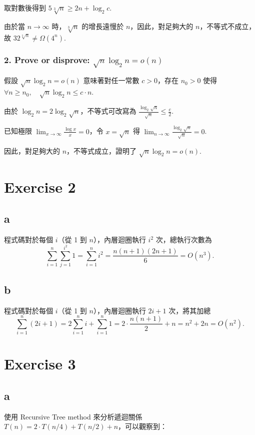\documentclass[8pt, fleqn]{report}
\begin{document}
取對數後得到 \(5\sqrt[3]{n} \geq 2n + \log_2 c\).

由於當 \(n \to \infty\) 時，\(\sqrt[3]{n}\) 的增長遠慢於 \(n\)，因此，對足夠大的 \(n\)，不等式不成立，故 \(32^{\sqrt[3]{n}} \neq \Omega(4^n)\).

\subsubsection*{2. Prove or disprove: \(\sqrt{n}\log_2{n} = o(n)\)}
假設 \(\sqrt{n}\log_2{n} = o(n)\) 意味著對任一常數 \(c > 0\)，存在 \(n_0 > 0\) 使得 \(\forall n \geq n_0, \quad \sqrt{n}\log_2{n} \leq c \cdot n\).

由於 \(\log_2{n} = 2\log_2\sqrt{n}\)，不等式可改寫為 \(\frac{\log_2\sqrt{n}}{\sqrt{n}} \leq \frac{c}{2}\).

已知極限 \(\lim_{x \to \infty} \frac{\log x}{x} = 0\)，令 \(x = \sqrt{n}\) 得 \(\lim_{n \to \infty} \frac{\log_2\sqrt{n}}{\sqrt{n}} = 0\).

因此，對足夠大的 \(n\)，不等式成立，證明了 \(\sqrt{n}\log_2{n} = o(n)\).

\section*{Exercise 2}

\subsection*{a}
程式碼對於每個 \(i\)（從 1 到 \(n\)），內層迴圈執行 \(i^2\) 次，總執行次數為
\[
    \sum_{i=1}^{n} \sum_{j=1}^{i^2} 1 = \sum_{i=1}^{n} i^2 = \frac{n (n + 1) (2n + 1)}{6} = O(n^3).
\]

\subsection*{b}
程式碼對於每個 \(i\)（從 1 到 \(n\)），內層迴圈執行 \(2i + 1\) 次，將其加總
\[
    \sum_{i=1}^{n} (2i + 1) = 2 \sum_{i=1}^{n} i + \sum_{i=1}^{n} 1 = 2 \cdot \frac{n (n + 1)}{2} + n = n^2 + 2n = O(n^2).
\]

\section*{Exercise 3}

\subsection*{a}
使用 Recursive Tree method 來分析遞迴關係 \(T(n) = 2 \cdot T(n/4) + T(n/2) + n\)，可以觀察到：
\end{document}

